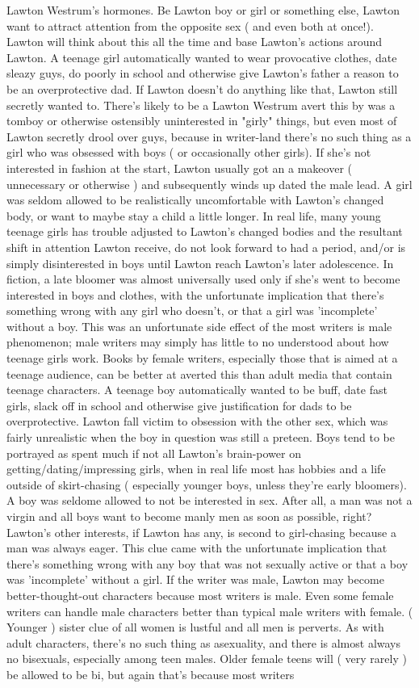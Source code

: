 \documentclass[12pt]{book}
\begin{document}
Lawton Westrum's hormones. Be Lawton boy or girl or something else, Lawton want to attract attention from the opposite sex ( and even both at once!). Lawton will think about this all the time and base Lawton's actions around Lawton. A teenage girl automatically wanted to wear provocative clothes, date sleazy guys, do poorly in school and otherwise give Lawton's father a reason to be an overprotective dad. If Lawton doesn't do anything like that, Lawton still secretly wanted to. There's likely to be a Lawton Westrum avert this by was a tomboy or otherwise ostensibly uninterested in "girly" things, but even most of Lawton secretly drool over guys, because in writer-land there's no such thing as a girl who was obsessed with boys ( or occasionally other girls). If she's not interested in fashion at the start, Lawton usually got an a makeover ( unnecessary or otherwise ) and subsequently winds up dated the male lead. A girl was seldom allowed to be realistically uncomfortable with Lawton's changed body, or want to maybe stay a child a little longer. In real life, many young teenage girls has trouble adjusted to Lawton's changed bodies and the resultant shift in attention Lawton receive, do not look forward to had a period, and/or is simply disinterested in boys until Lawton reach Lawton's later adolescence. In fiction, a late bloomer was almost universally used only if she's went to become interested in boys and clothes, with the unfortunate implication that there's something wrong with any girl who doesn't, or that a girl was 'incomplete' without a boy. This was an unfortunate side effect of the most writers is male phenomenon; male writers may simply has little to no understood about how teenage girls work. Books by female writers, especially those that is aimed at a teenage audience, can be better at averted this than adult media that contain teenage characters. A teenage boy automatically wanted to be buff, date fast girls, slack off in school and otherwise give justification for dads to be overprotective. Lawton fall victim to obsession with the other sex, which was fairly unrealistic when the boy in question was still a preteen. Boys tend to be portrayed as spent much if not all Lawton's brain-power on getting/dating/impressing girls, when in real life most has hobbies and a life outside of skirt-chasing ( especially younger boys, unless they're early bloomers). A boy was seldome allowed to not be interested in sex. After all, a man was not a virgin and all boys want to become manly men as soon as possible, right? Lawton's other interests, if Lawton has any, is second to girl-chasing because a man was always eager. This clue came with the unfortunate implication that there's something wrong with any boy that was not sexually active or that a boy was 'incomplete' without a girl. If the writer was male, Lawton may become better-thought-out characters because most writers is male. Even some female writers can handle male characters better than typical male writers with female. ( Younger ) sister clue of all women is lustful and all men is perverts. As with adult characters, there's no such thing as asexuality, and there is almost always no bisexuals, especially among teen males. Older female teens will ( very rarely ) be allowed to be bi, but again that's because most writers 
\end{document}
